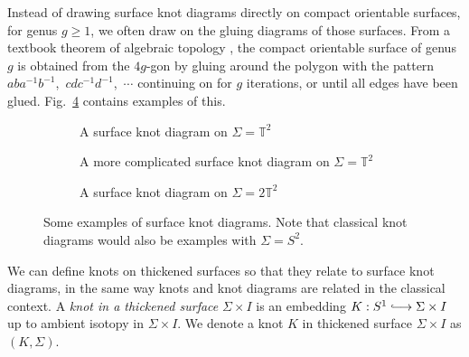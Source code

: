 \documentclass[12pt]{report}
\newcommand{\T}{\mathbb{T}}
\newcommand{\inject}{\lhook\joinrel\longrightarrow}
\begin{document}
Instead of drawing surface knot diagrams directly on compact orientable surfaces, for genus $g \geq 1$, we often draw on the gluing diagrams of those surfaces. From a textbook theorem of algebraic topology \parencite{algebraic-topology}, the compact orientable surface of genus $g$ is obtained from the $4g$-gon by gluing around the polygon with the pattern $aba^{-1}b^{-1}$,~$cdc^{-1}d^{-1}$,~$\cdots$ continuing on for $g$ iterations, or until all edges have been glued. Fig.~\ref{fig:surface-knot-diagram-examples} contains examples of this.
\begin{figure}[hbt!]
	\centering
	\hspace*{\fill}
	\begin{subfigure}[b]{0.3 \textwidth}
		\centering
		\def\svgscale{0.26}
		
		\caption{A surface knot diagram on $\Sigma = \T^{2}$}
		\label{fig:torus-unknot}
	\end{subfigure}
	\hspace*{\fill}
	\begin{subfigure}[b]{0.3 \textwidth}
		\centering
		\def\svgscale{0.26}
		
		\caption{A more complicated surface knot diagram on $\Sigma = \T^{2}$}
		\label{fig:torus-vknot}
	\end{subfigure}
	\hspace*{\fill}
	\begin{subfigure}[b]{0.3 \textwidth}
		\centering
		\def\svgscale{0.24}
		
		\caption{A surface knot diagram on $\Sigma = 2\T^{2}$}
		\label{fig:2torus-vknot}
	\end{subfigure}
	\caption{Some examples of surface knot diagrams. Note that classical knot diagrams would also be examples with $\Sigma = S^{2}$.}
	\label{fig:surface-knot-diagram-examples}
	\hspace*{\fill} 
\end{figure}

We can define knots on thickened surfaces so that they relate to surface knot diagrams, in the same way knots and knot diagrams are related in the classical context. A \textit{knot in a thickened surface} $\Sigma \times I$ is an embedding $K:S^{1} \inject \Sigma \times I$ up to ambient isotopy in $\Sigma \times I$. We denote a knot $K$ in thickened surface $\Sigma \times I$ as $(K, \Sigma)$.
\end{document}
